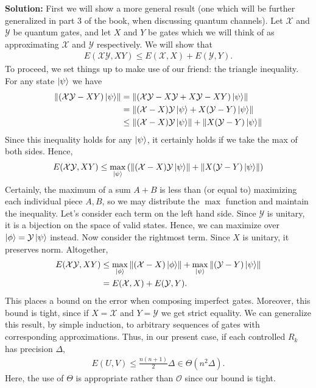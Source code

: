\documentclass{article}
\newcommand{\mc}[1]{\mathcal{#1}}
\begin{document}
\textbf{Solution:} First we will show a more general result (one which will be further generalized in part 3 of the book, when discussing quantum channels). Let $\mc{X}$ and $\mc{Y}$ be quantum gates, and let $X$ and $Y$ be gates which we will think of as approximating $\mc{X}$ and $\mc{Y}$ respectively. We will show that
\begin{align}
    E(\mc{XY},XY) \leq E(\mc{X},X) + E(\mc{Y},Y).
\end{align}
To proceed, we set things up to make use of our friend: the triangle inequality. For any state $\ket{\psi}$ we have
\begin{align}
    \left\|(\mc{XY}-XY)\ket{\psi}\right\|&=\left\|(\mc{X}\mc{Y}-X\mc{Y}+X\mc{Y}-XY)\ket{\psi}\right\| \\
    &= \left\|(\mc{X}-X)\mc{Y}\ket{\psi}+X(\mc{Y}-Y)\ket{\psi}\right\| \\
    &\leq \left\|(\mc{X}-X)\mc{Y}\ket{\psi}\right\|+\left\|X(\mc{Y}-Y)\ket{\psi}\right\|
\end{align}
Since this inequality holds for any $\ket{\psi}$, it certainly holds if we take the max of both sides. Hence,
\begin{align}
    E(\mc{XY},XY) \leq \max_{\ket{\psi}} \left(\left\|(\mc{X}-X)\mc{Y}\ket{\psi}\right\|+\left\|X(\mc{Y}-Y)\ket{\psi}\right\|\right)
\end{align}
Certainly, the maximum of a sum $A+B$ is less than (or equal to) maximizing each individual piece $A,B$, so we may distribute the $\max$ function and maintain the inequality. Let's consider each term on the left hand side. Since $\mc{Y}$ is unitary, it is a bijection on the space of valid states. Hence, we can maximize over $\ket{\phi} = \mc{Y}\ket{\psi}$ instead. Now consider the rightmost term. Since $X$ is unitary, it preserves norm. Altogether,
\begin{align}
     E(\mc{XY},XY) &\leq \max_{\ket{\phi}}\left\|(\mc{X}-X)\ket{\phi}\right\| + \max_{\ket{\psi}}\left\|(\mc{Y}-Y)\ket{\psi}\right\|\\
     &= E(\mc{X},X) + E(\mc{Y},Y).
\end{align}
This places a bound on the error when composing imperfect gates. Moreover, this bound is tight, since if $X=\mc{X}$ and $Y=\mc{Y}$ we get strict equality. 
We can generalize this result, by simple induction, to arbitrary sequences of gates with corresponding approximations. Thus, in our present case, if each controlled $R_k$ has precision $\Delta$, 
\begin{align}
    E(U,V) \leq \frac{n(n+1)}{2}\Delta \in \Theta(n^2 \Delta).
\end{align}
Here, the use of $\Theta$ is appropriate rather than $\mc{O}$ since our bound is tight.
\end{document}
